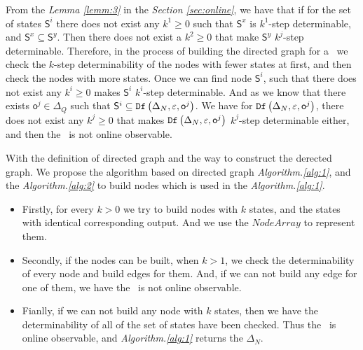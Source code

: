 From the {\em Lemma \ref{lemm:3}} in the {\em Section \ref{sec:online}}, we have that if for the set of states $\mathsf{S}^i$ there does not exist any $k^{1}\ge 0$ such that $\mathsf{S}^{x}$ is $k^{1}$-step determinable, and $\mathsf{S}^{x}\subseteq \mathsf{S}^{y}$. Then there does not exist a $k^{2}\ge 0$ that make $\mathsf{S}^{y}$ $k^{j}$-step determinable. Therefore, in the process of building the directed graph for a \BCN\ we check the $k$-step determinability of the nodes with fewer states at first, and then check the nodes with more states. Once we can find node $\mathsf{S}^i$, such that there does not exist any $k^{i}\ge0$ makes $\mathsf{S}^{i}$ $k^{i}$-step determinable. And as we know that there exists $\mathsf{o}^{j}\in \Delta_Q$ such that $\mathsf{S}^{i}\subseteq {\tt Df}\left(\Delta_N,\varepsilon, \mathsf{o}^{j}\right)$. We have for ${\tt Df}\left(\Delta_N,\varepsilon, \mathsf{o}^{j}\right)$, there does not exist any $k^{j}\ge 0$ that makes  ${\tt Df}\left(\Delta_N,\varepsilon, \mathsf{o}^{j}\right)$ $k^{j}$-step determinable either, and then the \BCN\ is not online observable. %

With the definition of directed graph and the way to construct the derected graph. We propose the algorithm based on directed graph {\em Algorithm.\ref{alg:1}}, and the {\em Algorithm.\ref{alg:2}} to build nodes which is used in the {\em Algorithm.\ref{alg:1}}.

\begin{itemize}
\item  Firstly, for every $k>0$ we try to build nodes with $k$ states, and the states with identical corresponding output. And we use the $NodeArray$ to represent them.
\item Secondly, if the nodes can  be built, when $k>1$, we check the determinability of every node and build edges for them. And, if we can not build any edge for one of them, we have the \BCN\ is not online observable.
\item Fianlly, if we can not build any node with $k$ states, then we have the determinability of all of the set of states have been checked. Thus the \BCN\ is online observable, and {\em Algorithm.\ref{alg:1}} returns the $\Delta_N$.
 \end{itemize}

